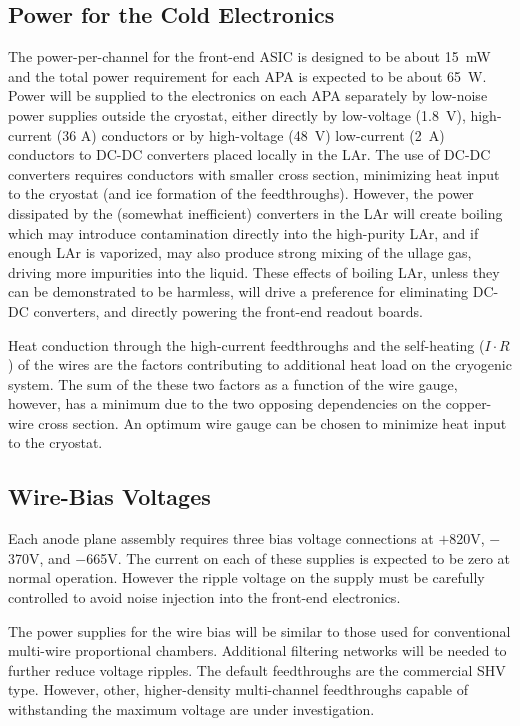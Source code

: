 %
\subsection{Power for the Cold Electronics }
\label{subsec:ce_feedthrough_power}

The power-per-channel for the front-end ASIC is designed to be about 15~mW and
the total power requirement for each APA is expected to be about 65~W.
Power will be supplied to the electronics on each APA separately by low-noise
power supplies outside the cryostat, either directly by
low-voltage (1.8~V), high-current (36 A) conductors or by high-voltage (48~V)
low-current (2~A) conductors to DC-DC converters placed locally in the LAr.
The use of DC-DC converters requires conductors with smaller cross section,
minimizing heat input to the cryostat (and ice formation of the feedthroughs).
However, the power dissipated by the (somewhat inefficient) converters in
the LAr will create boiling which may introduce contamination directly into the 
high-purity LAr, and if enough LAr is vaporized, may also produce strong mixing of the
ullage gas, driving more impurities into the liquid.
These effects of boiling LAr, unless they can be demonstrated to be harmless,
will drive a preference for eliminating DC-DC converters, and directly powering the front-end readout boards.

Heat conduction through the high-current feedthroughs and the self-heating ($I\cdot R$) of the wires are the factors
contributing to additional heat load on the cryogenic system.
The sum of the these two factors as a function of the wire gauge, however, has a minimum 
due to the two opposing dependencies on the copper-wire cross section.
An optimum wire gauge can be chosen to minimize heat input to the cryostat.

%
\subsection{Wire-Bias Voltages}
\label{subsec:ce_feedthrough_wirebias}

Each anode plane assembly requires three bias voltage connections 
at $+$820V, $-$370V, and $-$665V.
The current on each of these supplies is expected to be zero at normal operation.
However the ripple voltage on the supply must be carefully controlled 
to avoid noise injection into the front-end electronics.  

The power supplies for the wire bias will be similar to 
those used for conventional multi-wire proportional chambers. 
Additional filtering networks will 
be needed to further reduce voltage ripples.  
The default feedthroughs are the commercial SHV type.  
However,  other, higher-density multi-channel 
feedthroughs capable of withstanding the maximum voltage are under investigation.  

